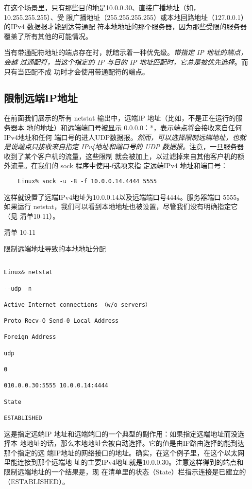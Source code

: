 在这个场景里，只有那些目的地是10.0.0.30、直接广播地址（如，10.255.255.255）、受
限广播地址（255.255.255.255）或本地回路地址（127.0.0.1）的IPv4 数据报才能到达带通配
符本地地址的那个服务器，因为那些受限的服务器覆盖了所有其他的可能情况。

当有带通配符地址的端点存在时，就暗示着一种优先级。\emph{带指定 IP 地址的端点，会越
过通配符，当这个指定的 IP 与目的 IP 地址匹配时，它总是被优先选择}。而只有当匹配不成
功时才会使用带通配符的端点。

\subsection{限制远端IP地址}
在前面我们展示的所有 netstat 输出中，远端IP 地址（比如，不是正在运行的服务器本
地的地址）和远端端口号被显示 0.0.0.0：*，表示端点将会接收来自任何IPv4地址和任何
端口号的进人UDP数据报。\emph{然而，可以选择限制远端地址，也就是说端点只接收来自指定
IPv4地址和端口号的 UDP 数据报。}注意，一旦服务器收到了某个客户机的流量，这些限制
就会被加上，以过滤掉来自其他客户机的额外流量。在我们的 sock 程序中使用-f选项来指
定远端IPv4 地址和端口号：

\begin{verbatim}
    Linux% sock -u -8 -f 10.0.0.14.4444 5555
\end{verbatim}

这样就设置了远端IPv4地址为10.0.0.14以及远端端口号4444。服务器端口
5555。如果运行 netstat，我们可以看到本地地址也被设置，尽管我们没有明确指定它（见
清单10-11）。

清单 10-11

限制远端地址导致的本地地址分配

\begin{verbatim}
    
Linux& netstat

--udp -n

Active Internet connections （w/o servers）

Proto Recv-O Send-0 Local Address

Foreign Address

udp

0

010.0.0.30:5555 10.0.0.14:4444

State

ESTABLISHED
\end{verbatim}

这是指定远端IP 地址和远端端口的一个典型的副作用：如果指定远端地址而没选择本
地地址的话，那么本地地址会被自动选择。它的值是由IP路由选择的能到达那个指定的远
端IP地址的网络接口的地址。确实，在这个例子里，在这个以太网里能连接到那个远端地
址的主要IPv4地址就是10.0.0.30。注意这样得到的端点和限制远端地址的一个结果是，现
在清单里的状态（State）栏指示连接是已建立的（ESTABLISHED）。

